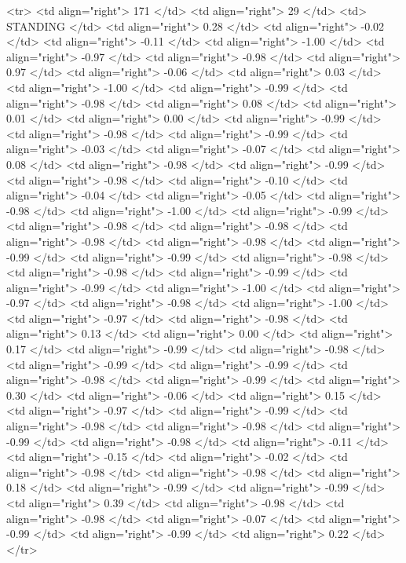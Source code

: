   <tr> <td align="right"> 171 </td> <td align="right">  29 </td> <td> STANDING </td> <td align="right"> 0.28 </td> <td align="right"> -0.02 </td> <td align="right"> -0.11 </td> <td align="right"> -1.00 </td> <td align="right"> -0.97 </td> <td align="right"> -0.98 </td> <td align="right"> 0.97 </td> <td align="right"> -0.06 </td> <td align="right"> 0.03 </td> <td align="right"> -1.00 </td> <td align="right"> -0.99 </td> <td align="right"> -0.98 </td> <td align="right"> 0.08 </td> <td align="right"> 0.01 </td> <td align="right"> 0.00 </td> <td align="right"> -0.99 </td> <td align="right"> -0.98 </td> <td align="right"> -0.99 </td> <td align="right"> -0.03 </td> <td align="right"> -0.07 </td> <td align="right"> 0.08 </td> <td align="right"> -0.98 </td> <td align="right"> -0.99 </td> <td align="right"> -0.98 </td> <td align="right"> -0.10 </td> <td align="right"> -0.04 </td> <td align="right"> -0.05 </td> <td align="right"> -0.98 </td> <td align="right"> -1.00 </td> <td align="right"> -0.99 </td> <td align="right"> -0.98 </td> <td align="right"> -0.98 </td> <td align="right"> -0.98 </td> <td align="right"> -0.98 </td> <td align="right"> -0.99 </td> <td align="right"> -0.99 </td> <td align="right"> -0.98 </td> <td align="right"> -0.98 </td> <td align="right"> -0.99 </td> <td align="right"> -0.99 </td> <td align="right"> -1.00 </td> <td align="right"> -0.97 </td> <td align="right"> -0.98 </td> <td align="right"> -1.00 </td> <td align="right"> -0.97 </td> <td align="right"> -0.98 </td> <td align="right"> 0.13 </td> <td align="right"> 0.00 </td> <td align="right"> 0.17 </td> <td align="right"> -0.99 </td> <td align="right"> -0.98 </td> <td align="right"> -0.99 </td> <td align="right"> -0.99 </td> <td align="right"> -0.98 </td> <td align="right"> -0.99 </td> <td align="right"> 0.30 </td> <td align="right"> -0.06 </td> <td align="right"> 0.15 </td> <td align="right"> -0.97 </td> <td align="right"> -0.99 </td> <td align="right"> -0.98 </td> <td align="right"> -0.98 </td> <td align="right"> -0.99 </td> <td align="right"> -0.98 </td> <td align="right"> -0.11 </td> <td align="right"> -0.15 </td> <td align="right"> -0.02 </td> <td align="right"> -0.98 </td> <td align="right"> -0.98 </td> <td align="right"> 0.18 </td> <td align="right"> -0.99 </td> <td align="right"> -0.99 </td> <td align="right"> 0.39 </td> <td align="right"> -0.98 </td> <td align="right"> -0.98 </td> <td align="right"> -0.07 </td> <td align="right"> -0.99 </td> <td align="right"> -0.99 </td> <td align="right"> 0.22 </td> </tr>

